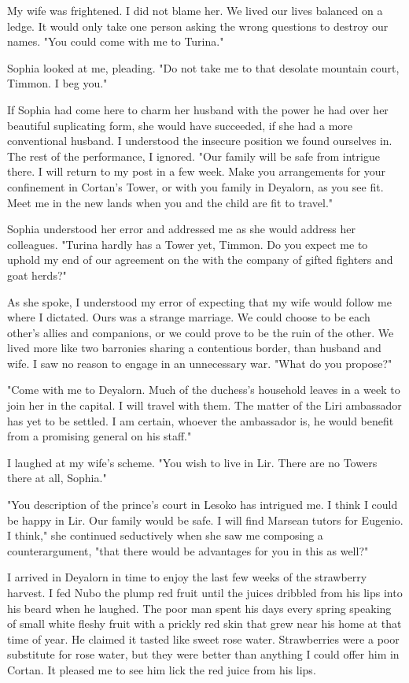 \documentclass{article}
\begin{document}
My wife was frightened. I did not blame her. We lived our lives balanced on a ledge. It would only take one person asking the wrong questions to destroy our names. "You could come with me to Turina."

Sophia looked at me, pleading. "Do not take me to that desolate mountain court, Timmon. I  beg you."

If Sophia had come here to charm her husband with the power he had over her beautiful suplicating form, she would have succeeded, if she had a more conventional husband. I understood the insecure position we found ourselves in. The rest of the performance, I ignored. "Our family will be safe from intrigue there. I will return to my post in a few week. Make you arrangements for your confinement in Cortan's Tower, or with you family in Deyalorn, as you see fit. Meet me in the new lands when you and the child are fit to travel." 

Sophia understood her error and addressed me as she would address her colleagues. "Turina hardly has a Tower yet, Timmon. Do you expect me to uphold my end of our agreement on the with the company of gifted fighters and goat herds?"

As she spoke, I understood my error of expecting that my wife would follow me where I dictated. Ours was a strange marriage. We could choose to be each other's allies and companions, or we could prove to be the ruin of the other. We lived more like two barronies sharing a contentious border, than husband and wife. I saw no reason to engage in an unnecessary war. "What do you propose?"

"Come with me to Deyalorn. Much of the duchess's household leaves in a week to join her in the capital. I will travel with them. The matter of the Liri ambassador has yet to be settled. I am certain, whoever the ambassador is, he would benefit from a promising general on his staff."

I laughed at my wife's scheme. "You wish to live in Lir. There are no Towers there at all, Sophia."

"You description of the prince's court in Lesoko has intrigued me. I think I could be happy in Lir. Our family would be safe. I will find Marsean tutors for Eugenio. I think," she continued seductively when she saw me composing a counterargument, "that there would be advantages for you in this as well?"

\vspace{.5 cm}

I arrived in Deyalorn in time to enjoy the last few weeks of the strawberry harvest. I fed Nubo the plump red fruit until the juices dribbled from his lips into his beard when he laughed. The poor man spent his days every spring speaking of small white fleshy fruit with a prickly red skin that grew near his home at that time of year. He claimed it tasted like sweet rose water. Strawberries were a poor substitute for rose water, but they were better than anything I could offer him in Cortan. It pleased me to see him lick the red juice from his lips.
\end{document}
